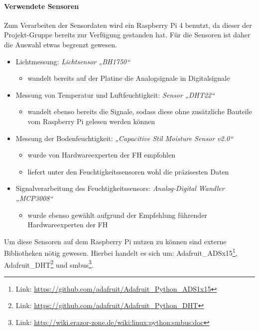 \hypertarget{verwendete-sensoren}{%
\paragraph{Verwendete Sensoren}\label{verwendete-sensoren}}

Zum Verarbeiten der Sensordaten wird ein Raspberry Pi 4 benutzt, da
dieser der Projekt-Gruppe bereits zur Verfügung gestanden hat. Für die
Sensoren ist daher die Auswahl etwas begrenzt gewesen.

\begin{itemize}
\tightlist
\item
  Lichtmessung: \emph{Lichtsensor „BH1750``}

  \begin{itemize}
  \tightlist
  \item
    wandelt bereits auf der Platine die Analogsignale in Digitalsignale
  \end{itemize}
\item
  Messung von Temperatur und Luftfeuchtigkeit: \emph{Sensor „DHT22``}

  \begin{itemize}
  \tightlist
  \item
    wandelt ebenso bereits die Signale, sodass diese ohne zusätzliche
    Bauteile vom Raspberry Pi gelesen werden können
  \end{itemize}
\item
  Messung der Bodenfeuchtigkeit: \emph{„Capacitive Stil Moisture Sensor
  v2.0``}

  \begin{itemize}
  \tightlist
  \item
    wurde von Hardwareexperten der FH empfohlen
  \item
    liefert unter den Feuchtigkeitssensoren wohl die präzisesten Daten
  \end{itemize}
\item
  Signalverarbeitung des Feuchtigkeitssensors: \emph{Analog-Digital
  Wandler „MCP3008``}

  \begin{itemize}
  \tightlist
  \item
    wurde ebenso gewählt aufgrund der Empfehlung führender
    Hardwareexperten der FH
  \end{itemize}
\end{itemize}

Um diese Sensoren auf dem Raspberry Pi nutzen zu können sind externe
Bibliotheken nötig gewesen. Hierbei handelt es sich um:
Adafruit\_ADSx15\footnote{Link:
  \url{https://github.com/adafruit/Adafruit_Python_ADS1x15}},
Adafruit\_DHT\footnote{Link:
  \url{https://github.com/adafruit/Adafruit_Python_DHT}} und
smbus\footnote{Link:
  \url{http://wiki.erazor-zone.de/wiki:linux:python:smbus:doc}}.

